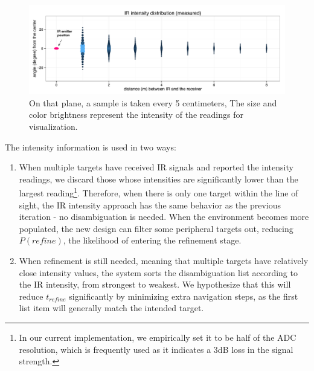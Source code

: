 \begin{figure}[t]
\centering
\includegraphics[width=0.95\columnwidth]{figures/IRIntensityDistribution.pdf}
\caption{ On that plane, a sample is taken every 5 centimeters,   The size and color brightness represent the intensity of the readings for visualization.}
\label{fig:measurement}
\end{figure}

The intensity information is used in two ways:
\begin{enumerate}
\item When multiple targets have received IR signals and reported the intensity readings, we discard those whose intensities are significantly lower than the largest reading\footnote{In our current implementation, we empirically set it to be half of the ADC resolution, which is frequently used as it indicates a 3dB loss in the signal strength.}. Therefore, when there is only one target within the line of sight, the IR intensity approach has the same behavior as the previous iteration - no disambiguation is needed. When the environment becomes more populated, the new design can filter some peripheral targets out, reducing $P(refine)$, the likelihood of entering the refinement stage.
\item When refinement is still needed, meaning that multiple targets have relatively close intensity values, the system sorts the disambiguation list according to the IR intensity, from strongest to weakest. We hypothesize that this will reduce $t_{refine}$ significantly by minimizing extra navigation steps, as the first list item will generally match the intended target.
\end{enumerate}

